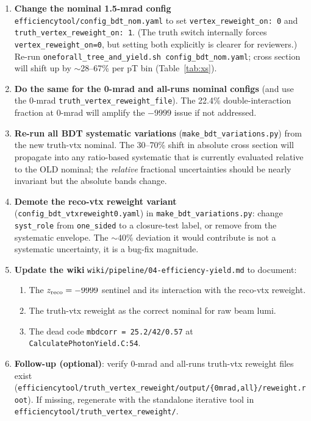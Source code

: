 \documentclass[11pt,a4paper]{article}
\begin{document}
\begin{enumerate}
\item \textbf{Change the nominal 1.5-mrad config} \texttt{efficiencytool/config\_bdt\_nom.yaml} to set \texttt{vertex\_reweight\_on: 0} and \texttt{truth\_vertex\_reweight\_on: 1}. (The truth switch internally forces \texttt{vertex\_reweight\_on=0}, but setting both explicitly is clearer for reviewers.) Re-run \texttt{oneforall\_tree\_and\_yield.sh config\_bdt\_nom.yaml}; cross section will shift up by $\sim$28--67\% per pT bin (Table~\ref{tab:xs}).
\item \textbf{Do the same for the 0-mrad and all-runs nominal configs} (and use the 0-mrad \texttt{truth\_vertex\_reweight\_file}). The 22.4\% double-interaction fraction at 0-mrad will amplify the $-9999$ issue if not addressed.
\item \textbf{Re-run all BDT systematic variations} (\texttt{make\_bdt\_variations.py}) from the new truth-vtx nominal. The 30--70\% shift in absolute cross section will propagate into any ratio-based systematic that is currently evaluated relative to the OLD nominal; the \emph{relative} fractional uncertainties should be nearly invariant but the absolute bands change.
\item \textbf{Demote the reco-vtx reweight variant} (\texttt{config\_bdt\_vtxreweight0.yaml}) in \texttt{make\_bdt\_variations.py}: change \texttt{syst\_role} from \texttt{one\_sided} to a closure-test label, or remove from the systematic envelope. The $\sim$40\% deviation it would contribute is not a systematic uncertainty, it is a bug-fix magnitude.
\item \textbf{Update the wiki} \texttt{wiki/pipeline/04-efficiency-yield.md} to document:
  \begin{enumerate}
    \item The $z_{\rm reco}=-9999$ sentinel and its interaction with the reco-vtx reweight.
    \item The truth-vtx reweight as the correct nominal for raw beam lumi.
    \item The dead code \texttt{mbdcorr = 25.2/42/0.57} at \texttt{CalculatePhotonYield.C:54}.
  \end{enumerate}
\item \textbf{Follow-up (optional)}: verify 0-mrad and all-runs truth-vtx reweight files exist (\texttt{efficiencytool/truth\_vertex\_reweight/output/\{0mrad,all\}/reweight.root}). If missing, regenerate with the standalone iterative tool in \texttt{efficiencytool/truth\_vertex\_reweight/}.
\end{enumerate}
\end{document}
